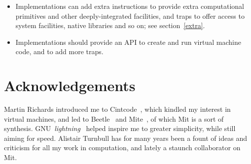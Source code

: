 \documentclass[a4paper]{article}
\begin{document}
\begin{itemize}
\item Implementations can add extra instructions to provide extra computational primitives and other deeply-integrated facilities, and traps to offer access to system facilities, native libraries and so on; see section~\ref{extra}.
\item Implementations should provide an API to create and run virtual machine code, and to add more traps.
\end{itemize}


\section*{Acknowledgements}

Martin Richards introduced me to Cintcode~\cite{cintweb}, which
kindled my interest in virtual machines, and led to
Beetle~\cite{beetledis} and Mite~\cite{mite0},
of which Mit is a sort of synthesis.
GNU~\emph{lightning}~\cite{lightning} helped inspire me to greater
simplicity, while still aiming for speed. Alistair Turnbull
has for many years been a fount of ideas and criticism for all my work in computation, and lately a staunch collaborator on Mit.



\end{document}
